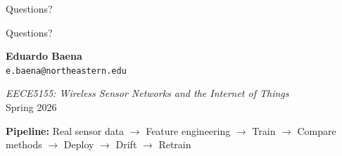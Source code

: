 \documentclass[aspectratio=169,11pt]{beamer}
\begin{document}
\begin{frame}{Questions?}
    \begin{center}
        \Huge Questions?

        \vspace{0.8cm}
        \normalsize
        \textbf{Eduardo Baena}\\
        \texttt{e.baena@northeastern.edu}

        \vspace{0.5cm}
        \textit{EECE5155: Wireless Sensor Networks and the Internet of Things}\\
        Spring 2026

        \vspace{0.4cm}
        \textbf{Pipeline:} Real sensor data $\rightarrow$ Feature engineering $\rightarrow$ Train $\rightarrow$
        Compare methods $\rightarrow$ Deploy $\rightarrow$ Drift $\rightarrow$ Retrain
    \end{center}
\end{frame}
\end{document}
